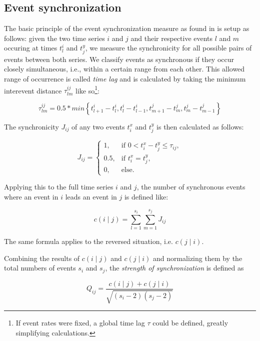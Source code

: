 \subsection{Event synchronization}
\label{sst:event_synchronization}
The basic principle of the event synchronization measure as found in \citet{QuianQuiroga.2002} is setup as follows: given the two time series $i$ and $j$ and their respective events $l$ and $m$ occuring at times $t^i_l$ and $t_j^y$, we measure the synchronicity for all possible pairs of events between both series. We classify events as synchronous if they occur closely simultaneous, i.e., within a certain range from each other. This allowed range of occurrence is called \textit{time lag} and is calculated by taking the minimum interevent distance $\tau^{ij}_{lm}$ like so\footnote{If event rates were fixed, a global time lag $\tau$ could be defined, greatly simplifying calculations.}:

\begin{equation}
\tau^{ij}_{lm} = 0.5 * min\left\{t^i_{l+1} - t^i_l, t^i_l - t^i_{l-1}, t^j_{m+1} - t^j_{m}, t^j_{m} - t^j_{m-1}\right\}
\end{equation}

The synchronicity $J_{ij}$ of any two events $t_i^x$ and $t_j^y$ is then calculated as follows:

\begin{equation}
  J_{ij} =
  \begin{cases}
    1, & \text{if } 0<t^x_i-t^y_j\leq\tau_{ij}, \\
    0.5, & \text{if } t^x_i=t^y_j, \\
    0, & \text{else.}
  \end{cases}
\end{equation}

Applying this to the full time series $i$ and $j$, the number of synchronous events where an event in $i$ leads an event in $j$ is defined like:

\begin{equation}
  c(i \mid j) = \sum\limits^{s_i}_{l=1} \sum\limits^{s_j}_{m=1} J_{ij}
\end{equation}

The same formula applies to the reversed situation, i.e. $c(j \mid i)$.

\pagebreak
Combining the results of $c(i\mid j)$ and $c(j \mid i)$ and normalizing them by the total numbers of events $s_i$ and $s_j$, the \textit{strength of synchronization} is defined as

\begin{equation} \label{eq:sync_strength}
  Q_{ij} = \frac{c(i \mid j) + c(j \mid i)}{\sqrt{(s_i - 2)(s_j - 2)}}
\end{equation}

